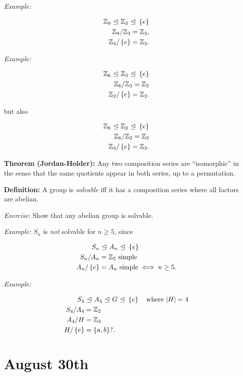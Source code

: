 \emph{Example:}

\begin{align*}
{\mathbb{Z}}_9 {~\trianglelefteq~} {\mathbb{Z}}_3 {~\trianglelefteq~} \left\{{e}\right\} \\
{\mathbb{Z}}_9 / {\mathbb{Z}}_3 = {\mathbb{Z}}_3,\\
{\mathbb{Z}}_3 / \left\{{e}\right\} = {\mathbb{Z}}_3
.\end{align*}

\emph{Example:}

\begin{align*}
{\mathbb{Z}}_6 {~\trianglelefteq~} {\mathbb{Z}}_3 {~\trianglelefteq~} \left\{{e}\right\} \\
{\mathbb{Z}}_6 / {\mathbb{Z}}_3 = {\mathbb{Z}}_2 \\
{\mathbb{Z}}_2 / \left\{{e}\right\} = {\mathbb{Z}}_2
.\end{align*}

but also

\begin{align*}
{\mathbb{Z}}_6 {~\trianglelefteq~} {\mathbb{Z}}_2 {~\trianglelefteq~} \left\{{e}\right\} \\
{\mathbb{Z}}_6 / {\mathbb{Z}}_2 = {\mathbb{Z}}_3 \\
{\mathbb{Z}}_3 / \left\{{e}\right\} = {\mathbb{Z}}_3
.\end{align*}

\textbf{Theorem (Jordan-Holder):} Any two composition series are
``isomorphic'' in the sense that the same quotients appear in both
series, up to a permutation.

\textbf{Definition:} A group is \emph{solvable} iff it has a composition
series where all factors are abelian.

\emph{Exercise}: Show that any abelian group is solvable.

\emph{Example:} \(S_n\) is \emph{not} solvable for \(n\geq 5\), since

\begin{align*}
S_n &{~\trianglelefteq~} A_n {~\trianglelefteq~} \left\{{e}\right\} \\
S_n / A_n &= {\mathbb{Z}}_2~\text{simple} \\
A_n / \left\{{e}\right\} &= A_n~\text{simple} \iff n\geq 5
.\end{align*}

\emph{Example:}

\begin{align*}
S_4 &{~\trianglelefteq~} A_4 {~\trianglelefteq~} G {~\trianglelefteq~} \left\{{e}\right\} \quad \text{where } {\left\lvert {H} \right\rvert} = 4 \\
S_4 / A_4 &= {\mathbb{Z}}_2 \\
A_4 / H &= {\mathbb{Z}}_3 \\
H / \left\{{e}\right\} &= \left\{{a, b}\right\}?
.\end{align*}

\hypertarget{august-30th}{%
\section{August 30th}\label{august-30th}}

